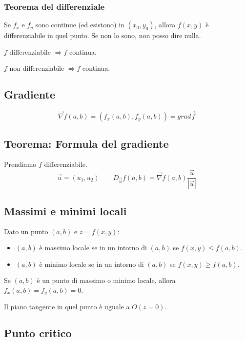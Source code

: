 \documentclass[10pt,a4paper,fleqn]{article}
\begin{document}
	\subsubsection{Teorema del differenziale}
	Se $f_x$ e $f_y$ sono continue (ed esistono) in $(x_0, y_0)$, allora $f(x,y)$ è differenziabile in quel punto. Se non lo sono, non posso dire nulla.
	
	$f$ differenziabile $\Rightarrow f$ continua.
	
	$f$ non differenziabile $\not\Rightarrow f$ continua.
	
	\subsection{Gradiente}

	\begin{equation}
	\vec{\nabla}f(a, b) = (f_x(a, b), f_y(a, b)) = grad \vec{f}
	\end{equation}

	\subsection{Teorema: Formula del gradiente}

	Prendiamo $f$ differenziabile.
	\begin{equation}
	\vec{u}=(u_1, u_2) \qquad D_{\vec{u}} f(a, b) = \vec{\nabla} f(a, b) \frac{\vec{u}}{|\vec{u}|}
	\end{equation}

	\subsection{Massimi e minimi locali}

	Dato un punto $(a, b)$ e $z = f(x, y)$:
	\begin{itemize}
		\item $(a, b)$ è massimo locale se in un intorno di $(a, b)$ se $f(x, y) \leq f(a, b)$.
		\item$(a, b)$ è minimo locale se in un intorno di $(a, b)$ se $f(x, y) \geq f(a, b)$.
	\end{itemize}
	
	Se $(a, b)$ è un punto di massimo o minimo locale, allora $f_x(a, b) = f_y(a, b) = 0$.
	
	Il piano tangente in quel punto è uguale a $O(z=0)$.

	\subsection{Punto critico}
\end{document}

